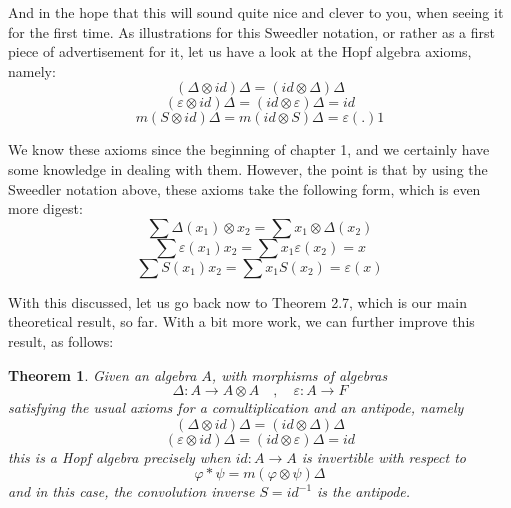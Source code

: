\documentclass[12pt]{amsbook}
\newtheorem{theorem}{Theorem}[chapter]
\begin{document}
And in the hope that this will sound quite nice and clever to you, when seeing it for the first time. As illustrations for this Sweedler notation, or rather as a first piece of advertisement for it, let us have a look at the Hopf algebra axioms, namely:
$$(\Delta\otimes id)\Delta=(id\otimes \Delta)\Delta$$
$$(\varepsilon\otimes id)\Delta=(id\otimes\varepsilon)\Delta=id$$
$$m(S\otimes id)\Delta=m(id\otimes S)\Delta=\varepsilon(.)1$$

We know these axioms since the beginning of chapter 1, and we certainly have some knowledge in dealing with them. However, the point is that by using the Sweedler notation above, these axioms take the following form, which is even more digest:
$$\sum\Delta(x_1)\otimes x_2=\sum x_1\otimes \Delta(x_2)$$ 
$$\sum\varepsilon(x_1)x_2=\sum x_1\varepsilon(x_2)=x$$ 
$$\sum S(x_1)x_2=\sum x_1S(x_2)=\varepsilon(x)$$

With this discussed, let us go back now to Theorem 2.7, which is our main theoretical result, so far. With a bit more work, we can further improve this result, as follows:

\begin{theorem}
Given an algebra $A$, with morphisms of algebras
$$\Delta:A\to A\otimes A\quad,\quad 
\varepsilon:A\to F$$
satisfying the usual axioms for a comultiplication and an antipode, namely
$$(\Delta\otimes id)\Delta=(id\otimes \Delta)\Delta$$
$$(\varepsilon\otimes id)\Delta=(id\otimes\varepsilon)\Delta=id$$
this is a Hopf algebra precisely when $id:A\to A$ is invertible with respect to 
$$\varphi*\psi=m(\varphi\otimes\psi)\Delta$$
and in this case, the convolution inverse $S=id^{-1}$ is the antipode.
\end{theorem}
\end{document}
